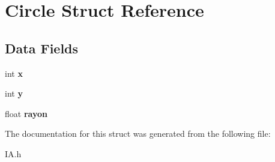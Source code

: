 \hypertarget{structCircle}{}\section{Circle Struct Reference}
\label{structCircle}
\subsection*{Data Fields}
\begin{DoxyCompactItemize}
\item 
\mbox{\label{structCircle_abceecd15b990054ddc30441cfcbb205d}} 
int {\bfseries x}
\item 
\mbox{\label{structCircle_a78aef28b3c176d14e8d25f8cd84e7dfd}} 
int {\bfseries y}
\item 
\mbox{\label{structCircle_a071d166f8d58ab6f055cdbbf494b33ce}} 
float {\bfseries rayon}
\end{DoxyCompactItemize}


The documentation for this struct was generated from the following file\+:\begin{DoxyCompactItemize}
\item 
I\+A.\+h\end{DoxyCompactItemize}
